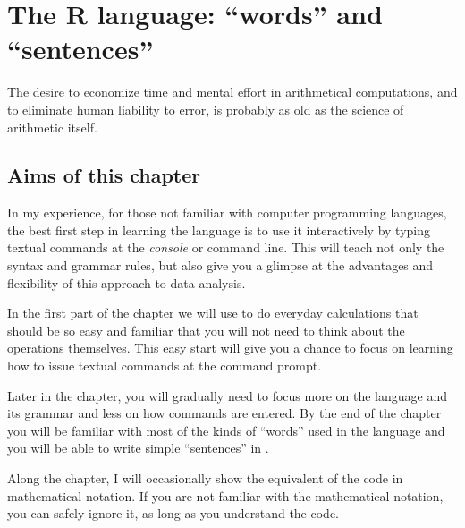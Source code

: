 \documentclass[krantz2]{krantz}\usepackage{knitr}
\begin{document}



\chapter{The R language: ``words'' and ``sentences''}\label{chap:R:as:calc}

\begin{VF}
The desire to economize time and mental effort in arithmetical computations, and to eliminate human liability to error, is probably as old as the science of arithmetic itself.

\nocite{Aiken1964}
\end{VF}


\section{Aims of this chapter}

In my experience, for those not familiar with computer programming languages, the best first step in learning the \Rlang language is to use it interactively by typing textual commands at the \emph{console} or command line. This will teach not only the syntax and grammar rules, but also give you a glimpse at the advantages and flexibility of this approach to data analysis.

In the first part of the chapter we will use \Rlang to do everyday calculations that should be so easy and familiar that you will not need to think about the operations themselves. This easy start will give you a chance to focus on learning how to issue textual commands at the command prompt.

Later in the chapter, you will gradually need to focus more on the \Rlang language and its grammar and less on how commands are entered. By the end of the chapter you will be familiar with most of the kinds of ``words'' used in the \Rlang language and you will be able to write simple ``sentences'' in \Rlang.

Along the chapter, I will occasionally show the equivalent of the \Rlang code in mathematical notation. If you are not familiar with the mathematical notation, you can safely ignore it, as long as you understand the \Rlang code.
\end{document}
